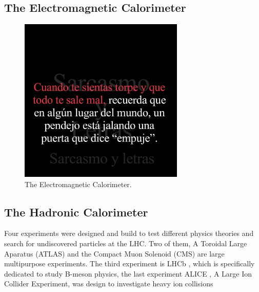 \subsection{The Electromagnetic Calorimeter}
\begin{figure}[!h]
  \centering
  \includegraphics[width=0.7\textwidth]{../images/ch2/7}
  \caption[The Electromagnetic Calorimeter]{ The Electromagnetic Calorimeter.}\label{fig:cms_layout}
\end{figure}
\subsection{The Hadronic Calorimeter}
Four experiments were designed and build to test different physics theories and search for undiscovered particles at the LHC. Two of them, A Toroidal Large Aparatus (ATLAS)\cite{atlas} and the Compact Muon Solenoid (CMS)\cite{cms_doc} are large multipurpose experiments. The third experiment is LHCb \cite{lhcb}, which is specifically dedicated to study B-meson physics, the last experiment ALICE \cite{alice}, A Large Ion Collider Experiment, was design to investigate heavy ion collisions


